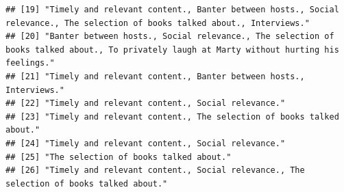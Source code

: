 \documentclass[]{article}
\begin{document}
\begin{verbatim}
## [19] "Timely and relevant content., Banter between hosts., Social relevance., The selection of books talked about., Interviews."                                                                                                                                                
## [20] "Banter between hosts., Social relevance., The selection of books talked about., To privately laugh at Marty without hurting his feelings."                                                                                                                                
## [21] "Timely and relevant content., Banter between hosts., Interviews."                                                                                                                                                                                                         
## [22] "Timely and relevant content., Social relevance."                                                                                                                                                                                                                          
## [23] "Timely and relevant content., The selection of books talked about."                                                                                                                                                                                                       
## [24] "Timely and relevant content., Social relevance."                                                                                                                                                                                                                          
## [25] "The selection of books talked about."                                                                                                                                                                                                                                     
## [26] "Timely and relevant content., Social relevance., The selection of books talked about."
\end{verbatim}
\end{document}
